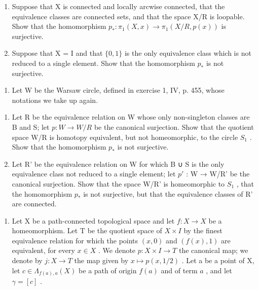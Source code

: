 \begin{enumerate}
\def\labelenumi{\alph{enumi})}
\item
  Suppose that X is connected and locally arcwise connected, that the equivalence classes are connected sets, and that the space X/R is loopable. Show that the homomorphism \(p_{*}:\pi_{1}(X,x)\to\pi_{1}(X/R,p(x))\) is surjective.
\item
  Suppose that X = I and that \(\{0,1\}\) is the only equivalence class which is not reduced to a single element. Show that the homomorphism \(p_{*}\) is not surjective.
\end{enumerate}

\begin{enumerate}
\def\labelenumi{\arabic{enumi})}
\setcounter{enumi}{9}
\tightlist
\item
  Let W be the Warsaw circle, defined in exercise 1, IV, p. 455, whose notations we take up again.
\end{enumerate}

\begin{enumerate}
\def\labelenumi{\alph{enumi})}
\item
  Let R be the equivalence relation on W whose only non-singleton classes are B and S; let \(p: W \rightarrow W/R\) be the canonical surjection. Show that the quotient space W/R is homotopy equivalent, but not homeomorphic, to the circle \(S_{1}\) . Show that the homomorphism \(p_{*}\) is not surjective.
\item
  Let R' be the equivalence relation on W for which B ∪ S is the only equivalence class not reduced to a single element; let \(p'\) : W → W/R' be the canonical surjection. Show that the space W/R' is homeomorphic to \(S_{1}\) , that the homomorphism \(p_{*}\) is not surjective, but that the equivalence classes of R' are connected.
\end{enumerate}

\begin{enumerate}
\def\labelenumi{\arabic{enumi})}
\setcounter{enumi}{10}
\tightlist
\item
  Let X be a path-connected topological space and let \(f: X \to X\) be a homeomorphism. Let T be the quotient space of \(X \times I\) by the finest equivalence relation for which the points \((x,0)\) and \((f(x),1)\) are equivalent, for every \(x \in X\) . We denote \(p: X \times I \to T\) the canonical map; we denote by \(j\colon X\to T\) the map given by \(x\mapsto p(x,1/2)\) . Let a be a point of X, let \(c\in\Lambda_{f(a),a}(X)\) be a path of origin \(f(a)\) and of term \(a\) , and let \(\gamma=[c]\) .
\end{enumerate}


